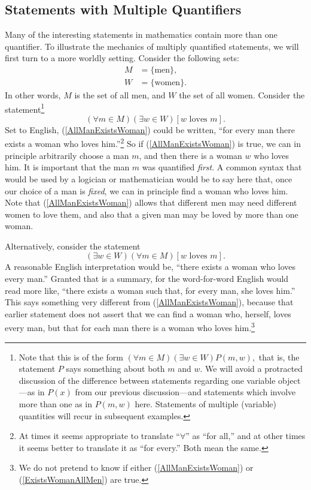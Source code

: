 \subsection{Statements with Multiple Quantifiers}
Many of the interesting statements in mathematics contain more
than one quantifier.  To illustrate the mechanics of 
multiply quantified statements, we will first
turn to a more worldly setting.  Consider the following sets:
\begin{align*}M&=\{\text{men}\},\\
              W&=\{\text{women}\}.\end{align*}
In other words, $M$ is the set of all men, and $W$ the set of all women.
Consider the statement\footnote{%
Note that this is of the form
$(\forall m\in M)(\exists w\in W)P(m,w),$
that is, the statement $P$ says something about both $m$ and $w$.
We will avoid a protracted discussion of the difference
between statements regarding one variable object---as in $P(x)$
from our previous discussion---and statements which involve
more than one as in $P(m,w)$ here.  Statements of multiple
(variable) quantities will recur in subsequent
examples.
}
\begin{equation}
(\forall m\in M)(\exists w\in W)[w\text{ loves }m].\label{AllManExistsWoman}
\end{equation}
Set to English, (\ref{AllManExistsWoman}) could be written, ``for
every man there exists a woman who loves him.''\footnote{%
At times it seems appropriate to translate ``$\forall$'' 
as ``for all,'' and at other times it seems better to 
translate it as ``for every.''  Both mean the same.
}
So if (\ref{AllManExistsWoman}) is true, 
we can in principle arbitrarily choose a man $m$, 
and then there is a woman $w$ who loves him.
It is important that the man $m$ was quantified {\it first}.
A common syntax that would be used by a logician or mathematician
would be to say here that, once our choice of
a man is {\it fixed}, we can in principle find a woman who
loves him.  Note that (\ref{AllManExistsWoman}) allows that
different men may need different women to love them, and
also that a given man may be loved by more than one woman.

Alternatively, consider the statement
\begin{equation}
(\exists w\in W)(\forall m\in M)[w\text{ loves }m].
\label{ExistsWomanAllMen}
\end{equation}
A reasonable English interpretation would be, ``there exists a
woman who loves every man.''  Granted that is a summary, for
the word-for-word English would read more like, 
``there exists a woman such that, for every man, she loves him.''
This says something very different from (\ref{AllManExistsWoman}),
because that earlier statement does not assert that we can
find a woman who, herself, loves every man, but that 
for each man there is a woman who loves him.\footnote{%
We do not pretend to know if either (\ref{AllManExistsWoman})
or (\ref{ExistsWomanAllMen}) are true.
}

